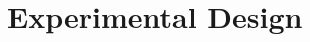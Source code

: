 \documentclass[12pt]{article}
\begin{document}



\section{Experimental Design}\label{sec:experimental_design}
\end{document}
